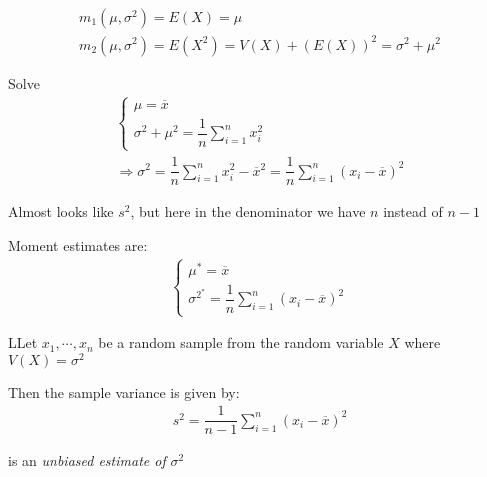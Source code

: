 \begin{equation*}
  \begin{gathered}
    m_1(\mu,\sigma^2) = E(X) = \mu\\
    m_2(\mu,\sigma^2) = E(X^2) = V(X) + (E(X))^2 = \sigma^2 + \mu^2
  \end{gathered}
\end{equation*}\par
\noindent Solve
\begin{equation*}
  \begin{gathered}
    \begin{cases}
      \mu = \overline{x}\\
      \sigma^2+\mu^2 = \dfrac{1}{n}\sum_{i=1}^{n}x_i^2
    \end{cases}\\
    \Rightarrow \sigma^2  = \dfrac{1}{n}\sum_{i=1}^{n}x_i^2-\overline{x}^2 = \dfrac{1}{n}\sum_{i=1}^{n}(x_i-\overline{x})^2
  \end{gathered}
\end{equation*}\par
\noindent Almost looks like $s^2$, but here in the denominator we have $n$ instead of $n-1$
\par\bigskip
\noindent Moment estimates are:
\begin{equation*}
  \begin{gathered}
    \begin{cases}
      \mu^* = \overline{x}\\
      \sigma^{2^*} = \dfrac{1}{n}\sum_{i=1}^{n}(x_i-\overline{x})^2
    \end{cases}
  \end{gathered}
\end{equation*}
\par\bigskip
\begin{theo}
  LLet $x_1,\cdots,x_n$ be a random sample from the random variable $X$ where $V(X) = \sigma^2$
  \par\bigskip
  \noindent Then the sample variance is given by:
  \begin{equation*}
    \begin{gathered}
      s^2 = \dfrac{1}{n-1}\sum_{i=1}^{n}(x_i-\overline{x})^2
    \end{gathered}
  \end{equation*}\par
  \noindent is an \textit{unbiased estimate of } $\sigma^2$
\end{theo}
\par\bigskip
